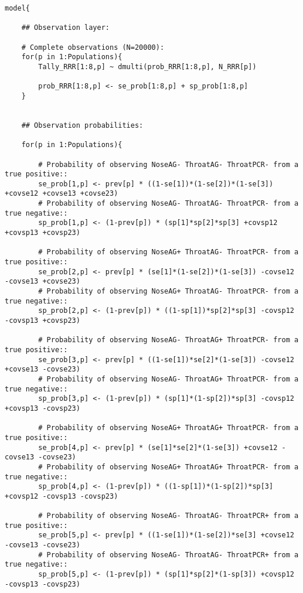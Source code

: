 \documentclass[
  ignorenonframetext,
  aspectratio=169,
]{beamer}
\begin{document}
\begin{frame}[fragile]
\scriptsize

\begin{verbatim}
model{

    ## Observation layer:

    # Complete observations (N=20000):
    for(p in 1:Populations){
        Tally_RRR[1:8,p] ~ dmulti(prob_RRR[1:8,p], N_RRR[p])

        prob_RRR[1:8,p] <- se_prob[1:8,p] + sp_prob[1:8,p]
    }


    ## Observation probabilities:

    for(p in 1:Populations){

        # Probability of observing NoseAG- ThroatAG- ThroatPCR- from a true positive::
        se_prob[1,p] <- prev[p] * ((1-se[1])*(1-se[2])*(1-se[3]) +covse12 +covse13 +covse23)
        # Probability of observing NoseAG- ThroatAG- ThroatPCR- from a true negative::
        sp_prob[1,p] <- (1-prev[p]) * (sp[1]*sp[2]*sp[3] +covsp12 +covsp13 +covsp23)

        # Probability of observing NoseAG+ ThroatAG- ThroatPCR- from a true positive::
        se_prob[2,p] <- prev[p] * (se[1]*(1-se[2])*(1-se[3]) -covse12 -covse13 +covse23)
        # Probability of observing NoseAG+ ThroatAG- ThroatPCR- from a true negative::
        sp_prob[2,p] <- (1-prev[p]) * ((1-sp[1])*sp[2]*sp[3] -covsp12 -covsp13 +covsp23)

        # Probability of observing NoseAG- ThroatAG+ ThroatPCR- from a true positive::
        se_prob[3,p] <- prev[p] * ((1-se[1])*se[2]*(1-se[3]) -covse12 +covse13 -covse23)
        # Probability of observing NoseAG- ThroatAG+ ThroatPCR- from a true negative::
        sp_prob[3,p] <- (1-prev[p]) * (sp[1]*(1-sp[2])*sp[3] -covsp12 +covsp13 -covsp23)

        # Probability of observing NoseAG+ ThroatAG+ ThroatPCR- from a true positive::
        se_prob[4,p] <- prev[p] * (se[1]*se[2]*(1-se[3]) +covse12 -covse13 -covse23)
        # Probability of observing NoseAG+ ThroatAG+ ThroatPCR- from a true negative::
        sp_prob[4,p] <- (1-prev[p]) * ((1-sp[1])*(1-sp[2])*sp[3] +covsp12 -covsp13 -covsp23)

        # Probability of observing NoseAG- ThroatAG- ThroatPCR+ from a true positive::
        se_prob[5,p] <- prev[p] * ((1-se[1])*(1-se[2])*se[3] +covse12 -covse13 -covse23)
        # Probability of observing NoseAG- ThroatAG- ThroatPCR+ from a true negative::
        sp_prob[5,p] <- (1-prev[p]) * (sp[1]*sp[2]*(1-sp[3]) +covsp12 -covsp13 -covsp23)


\end{verbatim}
\end{frame}
\end{document}
